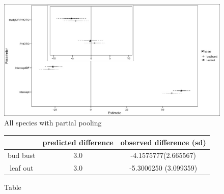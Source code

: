 \documentclass{article}[11pt]
\begin{document}
\begin{figure}[h!]
    \centering
 \includegraphics[width=\textwidth]{..//Plots/periodicity_figures/photothermo_allsps.jpeg}
    \caption{All species with partial pooling}
    \label{fig:Figure 3}
\end{figure}


\begin{figure}[h!]
    \centering
\begin{tabular}{|c|c|c|}
\hline
& predicted difference & observed difference (sd)\\
\hline
bud bust& 3.0 & -4.1575777(2.665567)\\
leaf out&3.0 & -5.3006250 (3.099359)\\
\hline
\end{tabular}
    \caption{Table}
    \label{fig:Figure 4}
\end{figure}
\end{document}
